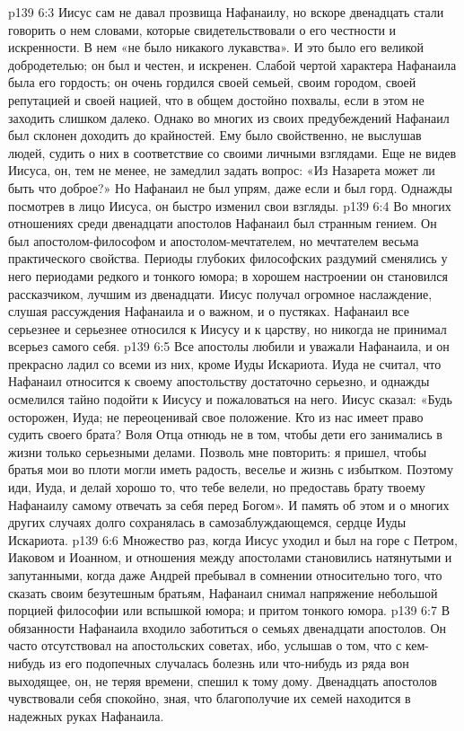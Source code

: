 \vs p139 6:3 \pc Иисус сам не давал прозвища Нафанаилу, но вскоре двенадцать стали говорить о нем словами, которые свидетельствовали о его честности и искренности. В нем «не было никакого лукавства». И это было его великой добродетелью; он был и честен, и искренен. Слабой чертой характера Нафанаила была его гордость; он очень гордился своей семьей, своим городом, своей репутацией и своей нацией, что в общем достойно похвалы, если в этом не заходить слишком далеко. Однако во многих из своих предубеждений Нафанаил был склонен доходить до крайностей. Ему было свойственно, не выслушав людей, судить о них в соответствие со своими личными взглядами. Еще не видев Иисуса, он, тем не менее, не замедлил задать вопрос: «Из Назарета может ли быть что доброе?» Но Нафанаил не был упрям, даже если и был горд. Однажды посмотрев в лицо Иисуса, он быстро изменил свои взгляды.
\vs p139 6:4 Во многих отношениях среди двенадцати апостолов Нафанаил был странным гением. Он был апостолом\hyp{}философом и апостолом\hyp{}мечтателем, но мечтателем весьма практического свойства. Периоды глубоких философских раздумий сменялись у него периодами редкого и тонкого юмора; в хорошем настроении он становился рассказчиком, лучшим из двенадцати. Иисус получал огромное наслаждение, слушая рассуждения Нафанаила и о важном, и о пустяках. Нафанаил все серьезнее и серьезнее относился к Иисусу и к царству, но никогда не принимал всерьез самого себя.
\vs p139 6:5 Все апостолы любили и уважали Нафанаила, и он прекрасно ладил со всеми из них, кроме Иуды Искариота. Иуда не считал, что Нафанаил относится к своему апостольству достаточно серьезно, и однажды осмелился тайно подойти к Иисусу и пожаловаться на него. Иисус сказал: «Будь осторожен, Иуда; не переоценивай свое положение. Кто из нас имеет право судить своего брата? Воля Отца отнюдь не в том, чтобы дети его занимались в жизни только серьезными делами. Позволь мне повторить: я пришел, чтобы братья мои во плоти могли иметь радость, веселье и жизнь с избытком. Поэтому иди, Иуда, и делай хорошо то, что тебе велели, но предоставь брату твоему Нафанаилу самому отвечать за себя перед Богом». И память об этом и о многих других случаях долго сохранялась в самозаблуждающемся, сердце Иуды Искариота.
\vs p139 6:6 Множество раз, когда Иисус уходил и был на горе с Петром, Иаковом и Иоанном, и отношения между апостолами становились натянутыми и запутанными, когда даже Андрей пребывал в сомнении относительно того, что сказать своим безутешным братьям, Нафанаил снимал напряжение небольшой порцией философии или вспышкой юмора; и притом тонкого юмора.
\vs p139 6:7 В обязанности Нафанаила входило заботиться о семьях двенадцати апостолов. Он часто отсутствовал на апостольских советах, ибо, услышав о том, что с кем\hyp{}нибудь из его подопечных случалась болезнь или что\hyp{}нибудь из ряда вон выходящее, он, не теряя времени, спешил к тому дому. Двенадцать апостолов чувствовали себя спокойно, зная, что благополучие их семей находится в надежных руках Нафанаила.
